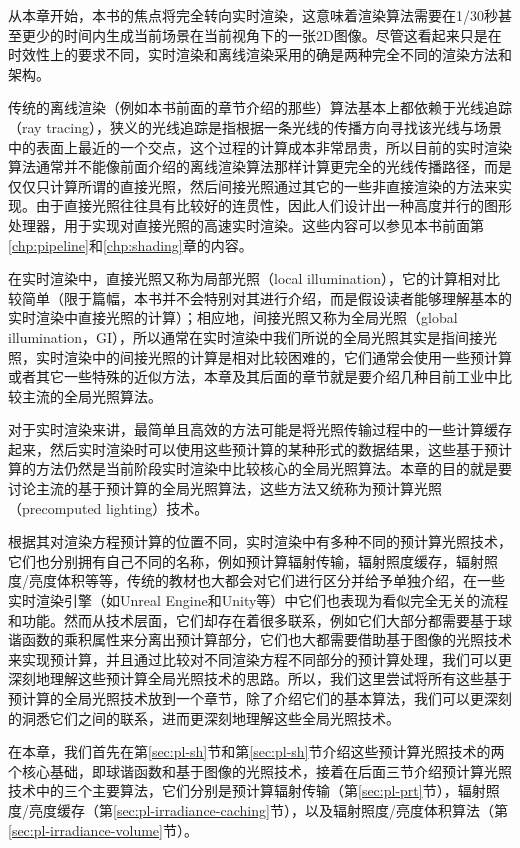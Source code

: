 从本章开始，本书的焦点将完全转向实时渲染，这意味着渲染算法需要在1/30秒甚至更少的时间内生成当前场景在当前视角下的一张2D图像。尽管这看起来只是在时效性上的要求不同，实时渲染和离线渲染采用的确是两种完全不同的渲染方法和架构。

传统的离线渲染（例如本书前面的章节介绍的那些）算法基本上都依赖于光线追踪（ray tracing），狭义的光线追踪是指根据一条光线的传播方向寻找该光线与场景中的表面上最近的一个交点，这个过程的计算成本非常昂贵，所以目前的实时渲染算法通常并不能像前面介绍的离线渲染算法那样计算更完全的光线传播路径，而是仅仅只计算所谓的直接光照，然后间接光照通过其它的一些非直接渲染的方法来实现。由于直接光照往往具有比较好的连贯性，因此人们设计出一种高度并行的图形处理器，用于实现对直接光照的高速实时渲染。这些内容可以参见本书前面第\ref{chp:pipeline}和\ref{chp:shading}章的内容。

在实时渲染中，直接光照又称为局部光照（local illumination），它的计算相对比较简单（限于篇幅，本书并不会特别对其进行介绍，而是假设读者能够理解基本的实时渲染中直接光照的计算）；相应地，间接光照又称为全局光照（global illumination，GI），所以通常在实时渲染中我们所说的全局光照其实是指间接光照，实时渲染中的间接光照的计算是相对比较困难的，它们通常会使用一些预计算或者其它一些特殊的近似方法，本章及其后面的章节就是要介绍几种目前工业中比较主流的全局光照算法。

对于实时渲染来讲，最简单且高效的方法可能是将光照传输过程中的一些计算缓存起来，然后实时渲染时可以使用这些预计算的某种形式的数据结果，这些基于预计算的方法仍然是当前阶段实时渲染中比较核心的全局光照算法。本章的目的就是要讨论主流的基于预计算的全局光照算法，这些方法又统称为预计算光照（precomputed lighting）技术。

根据其对渲染方程预计算的位置不同，实时渲染中有多种不同的预计算光照技术，它们也分别拥有自己不同的名称，例如预计算辐射传输，辐射照度缓存，辐射照度/亮度体积等等，传统的教材也大都会对它们进行区分并给予单独介绍，在一些实时渲染引擎（如Unreal Engine和Unity等）中它们也表现为看似完全无关的流程和功能。然而从技术层面，它们却存在着很多联系，例如它们大部分都需要基于球谐函数的乘积属性来分离出预计算部分，它们也大都需要借助基于图像的光照技术来实现预计算，并且通过比较对不同渲染方程不同部分的预计算处理，我们可以更深刻地理解这些预计算全局光照技术的思路。所以，我们这里尝试将所有这些基于预计算的全局光照技术放到一个章节，除了介绍它们的基本算法，我们可以更深刻的洞悉它们之间的联系，进而更深刻地理解这些全局光照技术。

在本章，我们首先在第\ref{sec:pl-sh}节和第\ref{sec:pl-sh}节介绍这些预计算光照技术的两个核心基础，即球谐函数和基于图像的光照技术，接着在后面三节介绍预计算光照技术中的三个主要算法，它们分别是预计算辐射传输（第\ref{sec:pl-prt}节），辐射照度/亮度缓存（第\ref{sec:pl-irradiance-caching}节），以及辐射照度/亮度体积算法（第\ref{sec:pl-irradiance-volume}节）。



